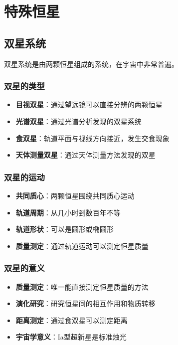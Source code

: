 \documentclass[12pt,UTF8]{ctexbook}
\begin{document}
\chapter{特殊恒星}
\section{双星系统}

双星系统是由两颗恒星组成的系统，在宇宙中非常普遍。

\subsection{双星的类型}

\begin{itemize}
  \item \textbf{目视双星}：通过望远镜可以直接分辨的两颗恒星
  \item \textbf{光谱双星}：通过光谱分析发现的双星系统
  \item \textbf{食双星}：轨道平面与视线方向接近，发生交食现象
  \item \textbf{天体测量双星}：通过天体测量方法发现的双星
\end{itemize}

\subsection{双星的运动}

\begin{itemize}
  \item \textbf{共同质心}：两颗恒星围绕共同质心运动
  \item \textbf{轨道周期}：从几小时到数百年不等
  \item \textbf{轨道形状}：可以是圆形或椭圆形
  \item \textbf{质量测定}：通过轨道运动可以测定恒星质量
\end{itemize}

\subsection{双星的意义}

\begin{itemize}
  \item \textbf{质量测定}：唯一能直接测定恒星质量的方法
  \item \textbf{演化研究}：研究恒星间的相互作用和物质转移
  \item \textbf{距离测定}：通过食双星可以测定距离
  \item \textbf{宇宙学意义}：Ia型超新星是标准烛光
\end{itemize}
\end{document}
